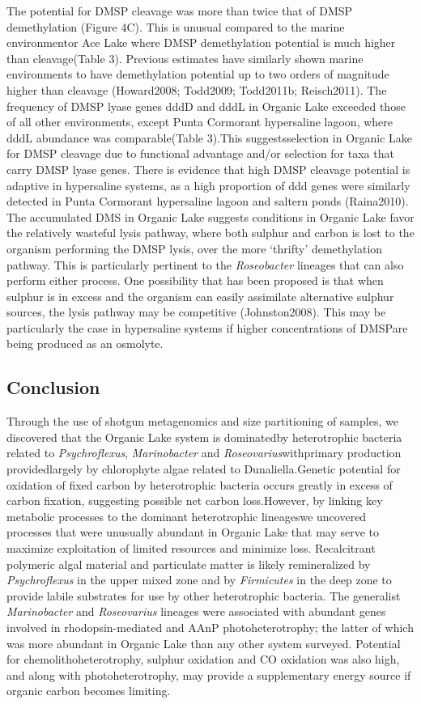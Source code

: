 {{The potential for \ac{DMSP} cleavage was more than twice that of \ac{DMSP} demethylation (Figure 4C). This is unusual compared to the marine environmentor Ace Lake where \ac{DMSP} demethylation potential is much higher than cleavage(Table 3). Previous estimates have similarly shown marine environments to have demethylation potential up to two orders of magnitude higher than cleavage (Howard2008; Todd2009; Todd2011b; Reisch2011). The frequency of \ac{DMSP} lyase genes dddD and dddL in Organic Lake exceeded those of all other environments, except Punta Cormorant hypersaline lagoon, where dddL abundance was comparable(Table 3).This suggestsselection in Organic Lake for \ac{DMSP} cleavage due to functional advantage and/or selection for taxa that carry \ac{DMSP} lyase genes. There is evidence that high \ac{DMSP} cleavage potential is adaptive in hypersaline systems, as a high proportion of ddd genes were similarly detected in Punta Cormorant hypersaline lagoon and saltern ponds (Raina2010). The accumulated \ac{DMS} in Organic Lake suggests conditions in Organic Lake favor the relatively wasteful lysis pathway, where both sulphur and carbon is lost to the organism performing the \ac{DMSP} lysis, over the more ‘thrifty’ demethylation pathway. This is particularly pertinent to the \emph{Roseobacter} lineages that can also perform either process. One possibility that has been proposed is that when sulphur is in excess and the organism can easily assimilate alternative sulphur sources, the lysis pathway may be competitive (Johnston2008). This may be particularly the case in hypersaline systems if higher concentrations of \ac{DMSP}are being produced as an osmolyte.

\subsection{Conclusion}
Through the use of shotgun metagenomics and size partitioning of samples, we discovered that the Organic Lake system is dominatedby heterotrophic bacteria related to \emph{Psychroflexus}, \emph{Marinobacter} and \emph{Roseovarius}withprimary production providedlargely by chlorophyte algae related to Dunaliella.Genetic potential for oxidation of fixed carbon by heterotrophic bacteria occurs greatly in excess of carbon fixation, suggesting possible net carbon loss.However, by linking key metabolic processes to the dominant heterotrophic lineageswe uncovered processes that were unusually abundant in Organic Lake that may serve to maximize exploitation of limited resources and minimize loss. Recalcitrant polymeric algal material and particulate matter is likely remineralized by \emph{Psychroflexus} in the upper mixed zone and by \emph{Firmicutes} in the deep zone to provide labile substrates for use by other heterotrophic bacteria. The generalist \emph{Marinobacter} and \emph{Roseovarius} lineages were associated with abundant genes involved in rhodopsin-mediated and \ac{AAnP} photoheterotrophy; the latter of which was more abundant in Organic Lake than any other system surveyed. Potential for chemolithoheterotrophy, sulphur oxidation and CO oxidation was also high, and along with photoheterotrophy, may provide a supplementary energy source if organic carbon becomes limiting.

}}
